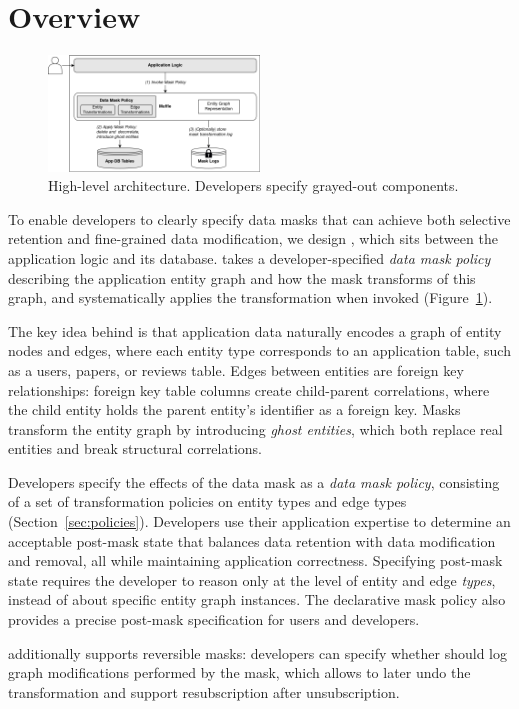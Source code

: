 \section{Overview}

\begin{figure}[t!]
    \centering
    \includegraphics[width=0.5\textwidth]{img/muffle}

    \caption{High-level \sys architecture. Developers specify grayed-out components.}
    \label{fig:arch}
\end{figure}

To enable developers to clearly specify data masks that can achieve both selective retention and
fine-grained data modification, we design \sys, which sits between the application logic and its
database. \sys takes a developer-specified \emph{data mask policy} describing the application entity
graph and how the mask transforms of this graph, and systematically applies the transformation when
invoked (Figure~\ref{fig:arch}). 

The key idea behind \sys is that application data naturally encodes a graph of 
entity nodes and edges, where each entity type corresponds to an application table, such as a users,
papers, or reviews table. Edges between entities are foreign key relationships: foreign key table
columns create child-parent correlations, where the child entity holds the parent entity's
identifier as a foreign key. 
Masks transform the entity graph by introducing \emph{ghost entities}, which both replace real
entities and break structural correlations. 

Developers specify the effects of the data mask as a \emph{data mask policy}, consisting of a set of
transformation policies on entity types and edge types (Section~\ref{sec:policies}).  Developers use
their application expertise to determine an acceptable post-mask state that balances data retention
with data modification and removal, all while maintaining application correctness. Specifying
post-mask state requires the developer to reason only at the level of entity and edge \emph{types},
instead of about specific entity graph instances.
The declarative mask policy also provides a precise post-mask specification for users and
developers. 

\sys additionally supports reversible masks: developers can specify whether \sys should log graph
modifications performed by the mask, which allows \sys to later undo the transformation and support \eg resubscription after unsubscription.
